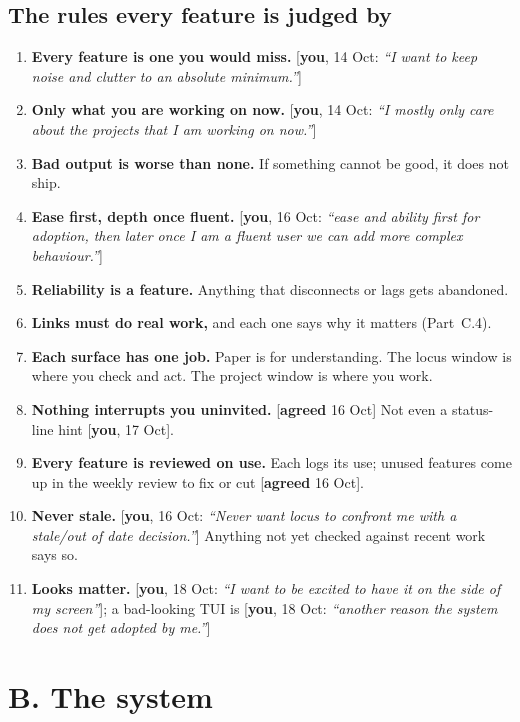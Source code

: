 \documentclass[10pt]{extarticle}
\newcommand{\you}[2]{{\small[\textbf{you}, #1: \textit{``#2''}]}}
\newcommand{\youx}[1]{{\small[\textbf{you}, #1]}}
\newcommand{\agreed}[1]{{\small[\textbf{agreed} #1]}}
\newcommand{\Sec}[1]{\section*{#1}\addcontentsline{toc}{section}{#1}}
\newcommand{\Sub}[1]{\subsection*{#1}}
\begin{document}
\Sub{The rules every feature is judged by}
\begin{enumerate}[label=R\arabic*.]
\item \textbf{Every feature is one you would miss.} \you{14 Oct}{I want to keep noise and clutter to an absolute minimum.}
\item \textbf{Only what you are working on now.} \you{14 Oct}{I mostly only care about the projects that I am working on now.}
\item \textbf{Bad output is worse than none.} If something cannot be good, it does not ship.
\item \textbf{Ease first, depth once fluent.} \you{16 Oct}{ease and ability first for adoption, then later once I am a fluent user we can add more complex behaviour.}
\item \textbf{Reliability is a feature.} Anything that disconnects or lags gets abandoned.
\item \textbf{Links must do real work,} and each one says why it matters (Part~C.4).
\item \textbf{Each surface has one job.} Paper is for understanding. The locus window is where you check and act. The project window is where you work.
\item \textbf{Nothing interrupts you uninvited.} \agreed{16 Oct} Not even a status-line hint \youx{17 Oct}.
\item \textbf{Every feature is reviewed on use.} Each logs its use; unused features come up in the weekly review to fix or cut \agreed{16 Oct}.
\item \textbf{Never stale.} \you{16 Oct}{Never want locus to confront me with a stale/out of date decision.} Anything not yet checked against recent work says so.
\item \textbf{Looks matter.} \you{18 Oct}{I want to be excited to have it on the side of my screen}; a bad-looking TUI is \you{18 Oct}{another reason the system does not get adopted by me.}
\end{enumerate}

\clearpage
\Sec{B. The system}
\end{document}
